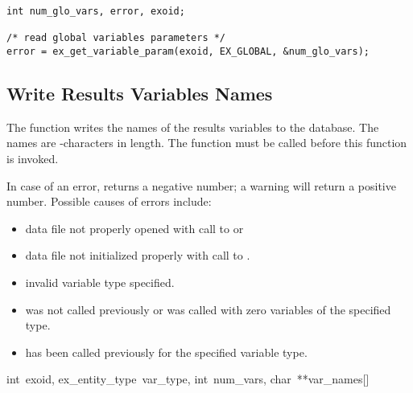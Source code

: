 \begin{lstlisting}
int num_glo_vars, error, exoid;

/* read global variables parameters */
error = ex_get_variable_param(exoid, EX_GLOBAL, &num_glo_vars);
\end{lstlisting}

\subsection{Write Results Variables Names}

The function  writes the names of the
results variables to the database. The names are
-characters in length. The function
 must be called before this function is
invoked.

In case of an error,  returns a negative
number; a warning will return a positive number.  Possible causes of
errors include:

\begin{itemize}
 \item data file not properly opened with call to 
 or 

 \item data file not initialized properly with call to .

 \item invalid variable type specified.

 \item {} was not called previously or was
 called with zero variables of the specified type.

 \item {} has been called previously for the
 specified variable type.
\end{itemize}

{int~exoid,
ex_entity_type~var_type,
int~num_vars,
char~**var_names[]}

